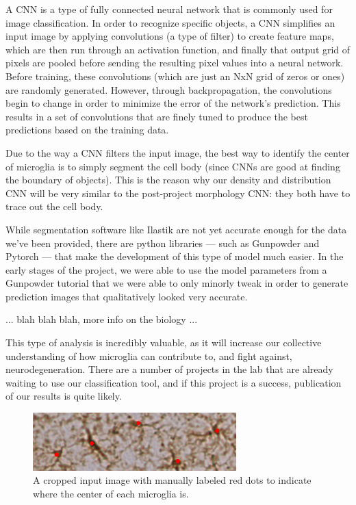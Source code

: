 \documentclass{article}
\begin{document}
A CNN is a type of fully connected neural network that is commonly used for 
image classification. In order to recognize specific objects, a CNN 
simplifies an input image by applying convolutions (a type of filter) to 
create feature maps, which are then run through an activation function, and 
finally that output grid of pixels are pooled before sending the resulting 
pixel values into a neural network. Before training, these convolutions (which
are just an NxN grid of zeros or ones) are randomly generated. However, 
through backpropagation, the convolutions begin to change in order to 
minimize the error of the network’s prediction. This results in a set of 
convolutions that are finely tuned to produce the best predictions based on 
the training data.

Due to the way a CNN filters the input image, the best way to identify the 
center of microglia is to simply segment the cell body (since CNNs are good 
at finding the boundary of objects). This is the reason why our density and 
distribution CNN will be very similar to the post-project morphology CNN: 
they both have to trace out the cell body.

While segmentation software like Ilastik are not yet accurate enough for the 
data we’ve been provided, there are python libraries — such as
Gunpowder\parencite{gunpowder} and Pytorch\parencite{pytorch} --- that make 
the development of this type of model much easier. In the early stages of the 
project, we were able to use the model parameters from a Gunpowder tutorial 
that we were able to only minorly tweak in order to generate prediction 
images that qualitatively looked very accurate.

... blah blah blah, more info on the biology ...

This type of analysis is incredibly valuable, as it will increase our 
collective understanding of how microglia can contribute to, and fight against,
neurodegeneration. There are a number of projects in the lab that are already 
waiting to use our classification tool, and if this project is a success, 
publication of our results is quite likely.

\begin{figure}
  \includegraphics[width=0.7\textwidth]{classification-dot.png}
  \centering
  \caption{A cropped input image with manually labeled red dots to indicate where 
  the center of each microglia is.}
  \label{fig:classification-dot}
\end{figure}
\end{document}
